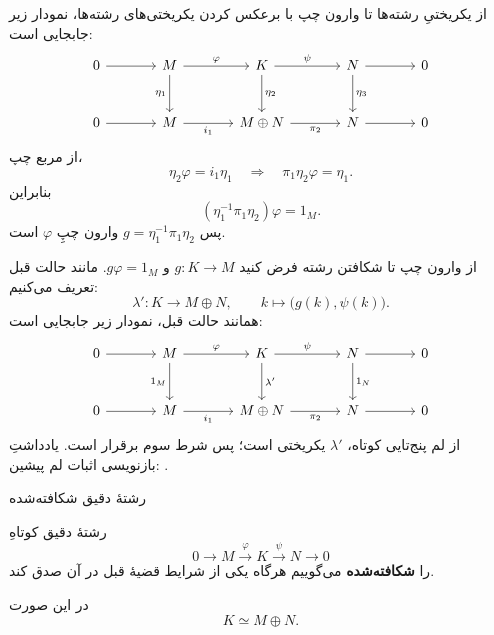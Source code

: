 \begin{frame}[t]{از یکریختیِ رشته‌ها تا وارون چپ}
    \label{lec16:split-left-inverse}
    با برعکس کردن یکریختی‌های رشته‌ها، نمودار زیر جابجایی است:
    \[
    \begin{tikzcd}[ampersand replacement=\&,column sep=large,row sep=large]
        0\arrow[r]\& M\arrow[r,"\varphi"]\arrow[d,"\eta_1"']
        \&K\arrow[r,"\psi"]\arrow[d,"\eta_2"]
        \&N\arrow[r]\arrow[d,"\eta_3"]\&0\\
        0\arrow[r]\& M\arrow[r,"i_1"']
        \&M\oplus N\arrow[r,"\pi_2"']\&N\arrow[r]\&0
    \end{tikzcd}
    \]
    از مربع چپ،
    \[
        \eta_2\varphi=i_1\eta_1
        \quad\Longrightarrow\quad
        \pi_1\eta_2\varphi=\eta_1.
    \]
    بنابراین
    \[
        (\eta_1^{-1}\pi_1\eta_2)\varphi=1_M.
    \]
    پس \(g=\eta_1^{-1}\pi_1\eta_2\) وارون چپِ \(\varphi\) است.
\end{frame}

\begin{frame}[t]{از وارون چپ تا شکافتن رشته}
    \label{lec16:split-left-map}
    فرض کنید \(g:K\to M\) و \(g\varphi=1_M\). مانند حالت قبل تعریف می‌کنیم:
    \[
        \lambda':K\longrightarrow M\oplus N,
        \qquad k\longmapsto\bigl(g(k),\psi(k)\bigr).
    \]
    همانند حالت قبل، نمودار زیر جابجایی است:
    \[
    \begin{tikzcd}[ampersand replacement=\&,column sep=large,row sep=large]
        0\arrow[r]\& M\arrow[r,"\varphi"]\arrow[d,"1_M"']
        \&K\arrow[r,"\psi"]\arrow[d,"\lambda'"]
        \&N\arrow[r]\arrow[d,"1_N"]\&0\\
        0\arrow[r]\& M\arrow[r,"i_1"']
        \&M\oplus N\arrow[r,"\pi_2"']\&N\arrow[r]\&0
    \end{tikzcd}
    \]
    از لم پنج‌تایی کوتاه، \(\lambda'\) یکریختی است؛ پس شرط سوم برقرار است.
    {\footnotesize یادداشتِ بازنویسی اثبات لم پیشین: .}
\end{frame}

\begin{frame}[t]{رشتهٔ دقیق شکافته‌شده}
    \label{lec16:split-exact-definition}
    \begin{definition}
        رشتهٔ دقیق کوتاهِ
        \[
            0\longrightarrow M\xrightarrow{\varphi}K
            \xrightarrow{\psi}N\longrightarrow0
        \]
        را \textbf{شکافته‌شده} می‌گوییم هرگاه یکی از شرایط قضیهٔ قبل در آن صدق کند.
    \end{definition}
    در این صورت
    \[
        K\simeq M\oplus N.
    \]
\end{frame}
